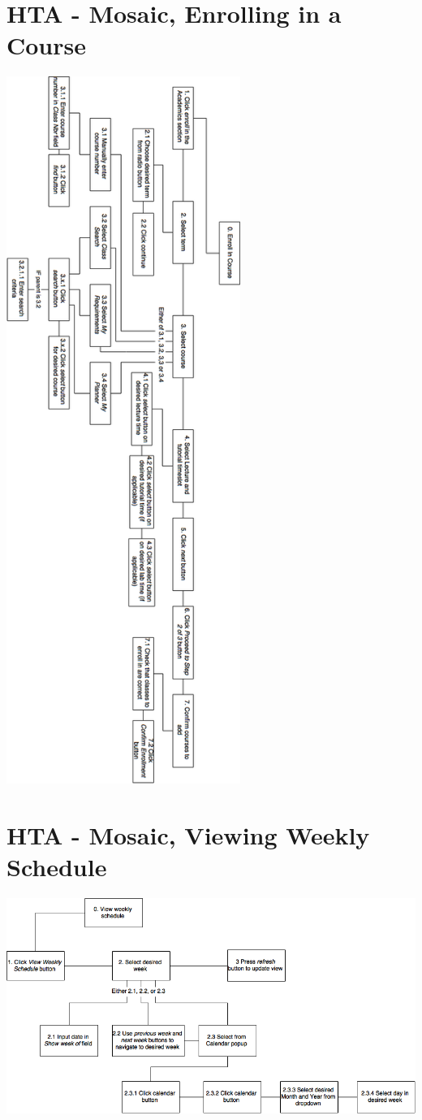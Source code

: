 \documentclass[10pt]{article}
\begin{document}
\section*{HTA - Mosaic, Enrolling in a Course}
\vspace{2mm}
\begin{center}
\includegraphics[width=3in]{MosaicEnroll.png}
\end{center}

\newpage
\section*{HTA - Mosaic, Viewing Weekly Schedule}
\vspace{2mm}
\begin{center}
\includegraphics[width=\textwidth]{MosaicViewSchedule.png}
\end{center}
\end{document}

